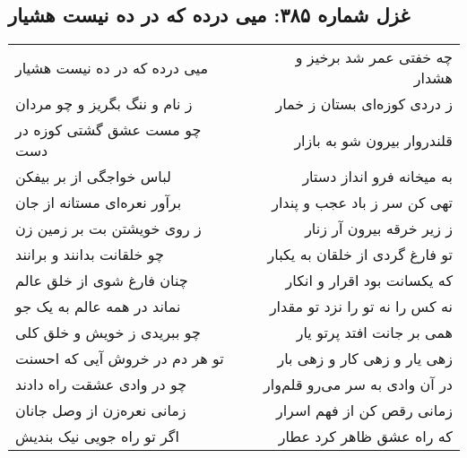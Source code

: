 \begin{center}
\section*{غزل شماره ۳۸۵: میی درده که در ده نیست هشیار}
\label{sec:385}
\begin{longtable}{l p{0.5cm} r}
میی درده که در ده نیست هشیار
&&
چه خفتی عمر شد برخیز و هشدار
\\
ز نام و ننگ بگریز و چو مردان
&&
ز دردی کوزه‌ای بستان ز خمار
\\
چو مست عشق گشتی کوزه در دست
&&
قلندروار بیرون شو به بازار
\\
لباس خواجگی از بر بیفکن
&&
به میخانه فرو انداز دستار
\\
برآور نعره‌ای مستانه از جان
&&
تهی کن سر ز باد عجب و پندار
\\
ز روی خویشتن بت بر زمین زن
&&
ز زیر خرقه بیرون آر زنار
\\
چو خلقانت بدانند و برانند
&&
تو فارغ گردی از خلقان به یکبار
\\
چنان فارغ شوی از خلق عالم
&&
که یکسانت بود اقرار و انکار
\\
نماند در همه عالم به یک جو
&&
نه کس را نه تو را نزد تو مقدار
\\
چو ببریدی ز خویش و خلق کلی
&&
همی بر جانت افتد پرتو یار
\\
تو هر دم در خروش آیی که احسنت
&&
زهی یار و زهی کار و زهی بار
\\
چو در وادی عشقت راه دادند
&&
در آن وادی به سر می‌رو قلم‌وار
\\
زمانی نعره‌زن از وصل جانان
&&
زمانی رقص کن از فهم اسرار
\\
اگر تو راه جویی نیک بندیش
&&
که راه عشق ظاهر کرد عطار
\\
\end{longtable}
\end{center}
